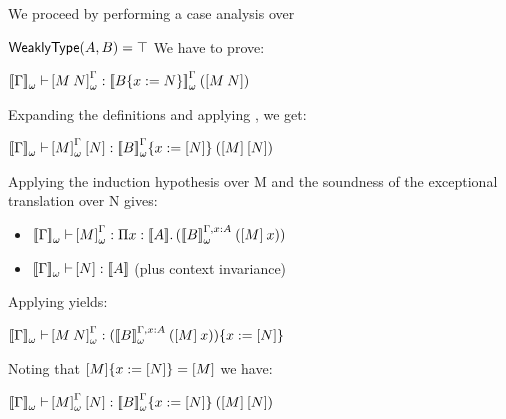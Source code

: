 \begin{Proof}
\begin{ProofCase}{\CicApp}
We proceed by performing a case analysis over \weaklypropFun{}
\begin{SubProofCase}{$\weaklypropFun[A,B] = \True$}
We have to prove:
\begin{center}
$\ctyping[\WContextTrans{\Context}][]{\WParamTrans{\app{M}{N}}}{
          \app{\WParamTypeTrans{\subst{B}{x}{N}}}{(\Trans{\app{M}{N}})}}$
\end{center}
Expanding the definitions and applying , we get:
\begin{center}
$\ctyping[\WContextTrans{\Context}][]{
         \app{\WParamTrans{M}}{\Trans{N}}}{
         \app{\subst{\WParamTypeTrans{B}}{x}{\Trans{N}}}{
              (\app{\Trans{M}}{\Trans{N}})}}$
\end{center}
Applying the induction hypothesis over M and the soundness of the exceptional translation over N gives:
\begin{itemize}
\item $\ctyping[\WContextTrans{\Context}][]{\WParamTrans{M}}{
                \depArrow{x}{\TypeTrans{A}}{(
                          \app{\WParamTypeTrans[\Context,\typing{x}{A}]{B}}{(\app{\Trans{M}}{x})})}}$
\item $\ctyping[\WContextTrans{\Context}][]{\Trans{N}}{\TypeTrans{A}}$ (plus context invariance)
\end{itemize}
Applying \CicApp{} yields:
\begin{center}
$\ctyping[\WContextTrans{\Context}][]{\WParamTrans{\app{M}{N}}}{
          \subst{(\app{\WParamTypeTrans[\Context,\typing{x}{A}]{B}}{(\app{\Trans{M}}{x})})}{x}{\Trans{N}}}$
\end{center}
Noting that $\subst{\Trans{M}}{x}{\Trans{N}}\termEq\Trans{M}$ we have:
\begin{center}
$\ctyping[\WContextTrans{\Context}][]{
         \app{\WParamTrans{M}}{\Trans{N}}}{
         \app{\subst{\WParamTypeTrans{B}}{x}{\Trans{N}}}{
              (\app{\Trans{M}}{\Trans{N}})}}$
\end{center}
\end{SubProofCase}


\end{ProofCase}
\end{Proof}
